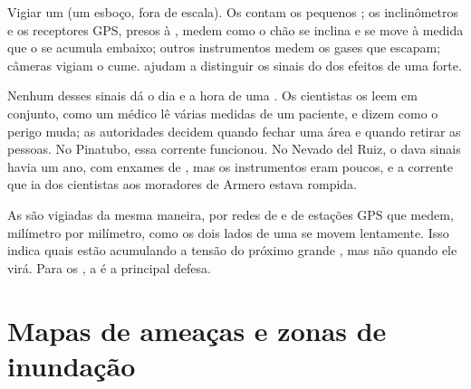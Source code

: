 \begin{omfigure}
{\small Vigiar um  (um esboço, fora de escala). Os 
contam os pequenos ; os inclinômetros e os receptores GPS,
presos à , medem como o chão se inclina e se move à medida que o
 se acumula embaixo; outros instrumentos medem os gases que
escapam; câmeras vigiam o cume.  ajudam a distinguir os
sinais do  dos efeitos de uma  forte.}
\label{fig:g9:natural-risks:monitoring}
\end{omfigure}

Nenhum desses sinais dá o dia e a hora de uma . Os cientistas os
leem em conjunto, como um médico lê várias medidas de um paciente, e
dizem como o perigo muda; as autoridades decidem quando fechar uma área e
quando retirar as pessoas. No Pinatubo, essa corrente funcionou. No
Nevado del Ruiz, o  dava sinais havia um ano, com enxames de
, mas os instrumentos eram poucos, e a corrente que ia dos
cientistas aos moradores de Armero estava rompida.

As  são vigiadas da mesma maneira, por redes de  e de
estações GPS que medem, milímetro por milímetro, como os dois lados de
uma  se movem lentamente. Isso indica quais  estão acumulando
a tensão do próximo grande , mas não quando ele virá. Para os
, a  é a principal defesa.

\section{Mapas de ameaças e zonas de inundação}

